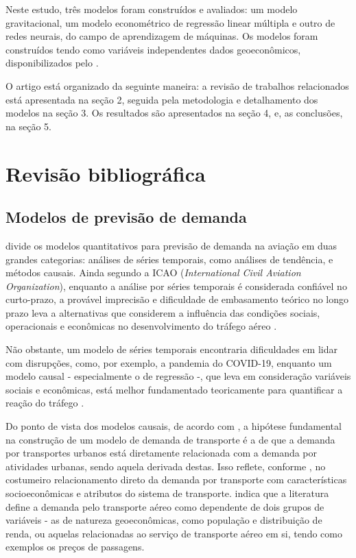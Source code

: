 \documentclass[a4paper,9pt,twocolumn,twoside,]{pinp}
\begin{document}
Neste estudo, três modelos foram construídos e avaliados: um modelo
gravitacional, um modelo econométrico de regressão linear múltipla e
outro de redes neurais, do campo de aprendizagem de máquinas. Os modelos
foram construídos tendo como variáveis independentes dados
geoeconômicos, disponibilizados pelo
\citet{instituto_de_pesquisa_economica_aplicada_atlas_2020}.

O artigo está organizado da seguinte maneira: a revisão de trabalhos
relacionados está apresentada na seção 2, seguida pela metodologia e
detalhamento dos modelos na seção 3. Os resultados são apresentados na
seção 4, e, as conclusões, na seção 5.

\hypertarget{revisuxe3o-bibliogruxe1fica}{%
\section{Revisão bibliográfica}\label{revisuxe3o-bibliogruxe1fica}}

\hypertarget{sec:modelos-demanda-rev}{%
\subsection{Modelos de previsão de
demanda}\label{sec:modelos-demanda-rev}}

\citet{icao_doc_2006} divide os modelos quantitativos para previsão de
demanda na aviação em duas grandes categorias: análises de séries
temporais, como análises de tendência, e métodos causais. Ainda segundo
a ICAO (\emph{International Civil Aviation Organization}), enquanto a
análise por séries temporais é considerada confiável no curto-prazo, a
provável imprecisão e dificuldade de embasamento teórico no longo prazo
leva a alternativas que considerem a influência das condições sociais,
operacionais e econômicas no desenvolvimento do tráfego aéreo
\citep{icao_doc_2006}.

Não obstante, um modelo de séries temporais encontraria dificuldades em
lidar com disrupções, como, por exemplo, a pandemia do COVID-19,
enquanto um modelo causal - especialmente o de regressão -, que leva em
consideração variáveis sociais e econômicas, está melhor fundamentado
teoricamente para quantificar a reação do tráfego
\citep{doganis_flying_2005}.

Do ponto de vista dos modelos causais, de acordo com
\citet{kanafani_transportation_1983}, a hipótese fundamental na
construção de um modelo de demanda de transporte é a de que a demanda
por transportes urbanos está diretamente relacionada com a demanda por
atividades urbanas, sendo aquela derivada destas. Isso reflete, conforme
\citet{kanafani_transportation_1983}, no costumeiro relacionamento
direto da demanda por transporte com características socioeconômicas e
atributos do sistema de transporte. \citet{jorge-calderon_demand_1997}
indica que a literatura define a demanda pelo transporte aéreo como
dependente de dois grupos de variáveis - as de natureza geoeconômicas,
como população e distribuição de renda, ou aquelas relacionadas ao
serviço de transporte aéreo em si, tendo como exemplos os preços de
passagens.
\end{document}
